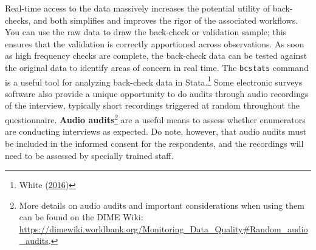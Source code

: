 \documentclass[
]{book}
\begin{document}
Real-time access to the data massively increases the potential utility of back-checks,
and both simplifies and improves the rigor of the associated workflows.
You can use the raw data to draw the back-check or validation sample;
this ensures that the validation is correctly apportioned across observations.
As soon as high frequency checks are complete,
the back-check data can be tested against
the original data to identify areas of concern in real time.
The \texttt{bcstats} command is a useful tool for analyzing back-check data in Stata.\footnote{White (\protect\hyperlink{ref-white2016bcstats}{2016})}
Some electronic surveys software also provide a unique opportunity
to do audits through audio recordings of the interview,
typically short recordings triggered at random throughout the questionnaire.
\textbf{Audio audits}\footnote{More details on audio audits and important considerations when using them
  can be found on the DIME Wiki:
  \url{https://dimewiki.worldbank.org/Monitoring_Data_Quality\#Random_audio_audits}.}
are a useful means to assess whether enumerators are conducting interviews as expected.
Do note, however, that audio audits must be included in the informed consent for the respondents,
and the recordings will need to be assessed by specially trained staff.
\end{document}
